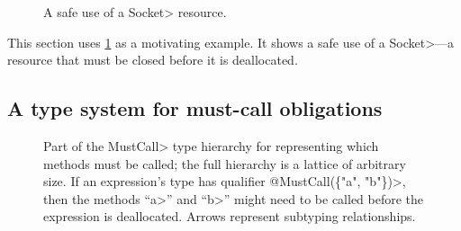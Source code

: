 \begin{figure}
  
  \caption{A safe use of a \<Socket> resource.}
  \label{fig:example}
\end{figure}

\noindent
This section uses \cref{fig:example} as a motivating example.
It shows
a safe use of a \<Socket>---a resource that must be closed before
it is deallocated.

\subsection{A type system for must-call obligations}
\label{sec:must-call}

\begin{figure}

\caption{Part of the \<MustCall> type hierarchy for representing which methods must be
  called; the full hierarchy is a
  lattice of arbitrary size.
  If an expression's type has qualifier \<@Must\-Call(\{"a", "b"\})>, then
  the methods ``\<a>'' and ``\<b>'' might need to be called before the
  expression is deallocated.
  Arrows represent
  subtyping relationships.
}
\label{fig:must-call-hierarchy}
\end{figure}

